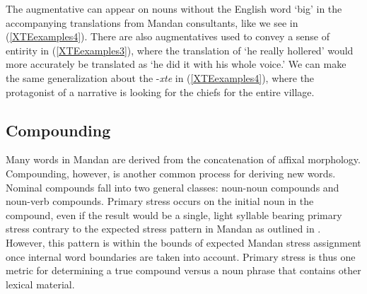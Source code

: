 The augmentative can appear on nouns without the English word `big' in the accompanying translations from Mandan consultants, like we see in (\ref{XTEexamples4}). There are also augmentatives used to convey a sense of entirity in (\ref{XTEexamples3}), where the translation of `he really hollered' would more accurately be translated as `he did it with his whole voice.' We can make the same generalization about the -\textit{xte} in (\ref{XTEexamples4}), where the protagonist of a narrative is looking for the chiefs for the entire village.







\subsection{Compounding}\label{SubSecCompounding}

Many words in Mandan are derived from the concatenation of affixal morphology. Compounding, however, is another common process for deriving new words. Nominal compounds fall into two general classes: noun-noun compounds and noun-verb compounds. Primary stress occurs on the initial noun in the compound, even if the result would be a single, light syllable bearing primary stress contrary to the expected stress pattern in Mandan as outlined in . However, this pattern is within the bounds of expected Mandan stress assignment once internal word boundaries are taken into account. Primary stress is thus one metric for determining a true compound versus a noun phrase that contains other lexical material.

